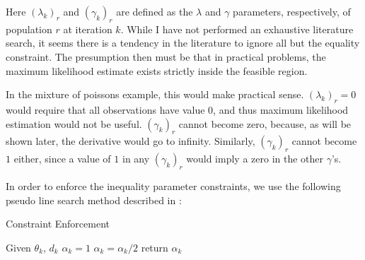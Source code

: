 \documentclass[letter,12pt]{article}
\begin{document}
Here $(\lambda_k)_r$ and $(\gamma_k)_r$ are defined as the $\lambda$ and $\gamma$ parameters, respectively, of population $r$ at iteration $k$.  While I have not performed an exhaustive literature search, it seems there is a tendency in the literature to ignore all but the equality constraint.  The presumption then must be that in practical problems, the maximum likelihood estimate exists strictly inside the feasible region.  

In the mixture of poissons example, this would make practical sense.  $(\lambda_k)_r=0$ would require that all observations have value $0$, and thus maximum likelihood estimation would not be useful.  $(\gamma_k)_r$ cannot become zero, because, as will be shown later, the derivative would go to infinity.  Similarly, $(\gamma_k)_r$ cannot become $1$ either, since a value of $1$ in any $(\gamma_k)_r$ would imply a zero in the other $\gamma$'s.

In order to enforce the inequality parameter constraints, we use the following pseudo line search method described in \cite{jamshidianj97}:
 
\begin{algorithm}[H]
\caption{Constraint Enforcement}
\label{alg:constraint_enforecement}
\begin{algorithmic}[1]
\State Given $\theta_k$, $d_k$
\State $\alpha_k = 1$
\State $\alpha_k = \alpha_k / 2$
\EndWhile
\State return $\alpha_k$
\end{algorithmic}
\end{algorithm}
\end{document}
